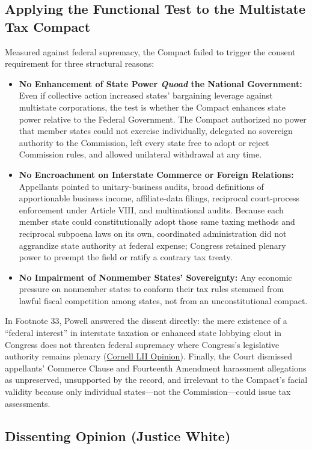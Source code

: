 \documentclass[12pt]{article}
\begin{document}
\subsection{Applying the Functional Test to the Multistate Tax Compact}
Measured against federal supremacy, the Compact failed to trigger the consent requirement for three structural reasons:
\begin{itemize}
  \item \textbf{No Enhancement of State Power \textit{Quoad} the National Government:} Even if collective action increased states' bargaining leverage against multistate corporations, the test is whether the Compact enhances state power relative to the Federal Government. The Compact authorized no power that member states could not exercise individually, delegated no sovereign authority to the Commission, left every state free to adopt or reject Commission rules, and allowed unilateral withdrawal at any time.
  \item \textbf{No Encroachment on Interstate Commerce or Foreign Relations:} Appellants pointed to unitary-business audits, broad definitions of apportionable business income, affiliate-data filings, reciprocal court-process enforcement under Article VIII, and multinational audits. Because each member state could constitutionally adopt those same taxing methods and reciprocal subpoena laws on its own, coordinated administration did not aggrandize state authority at federal expense; Congress retained plenary power to preempt the field or ratify a contrary tax treaty.
  \item \textbf{No Impairment of Nonmember States' Sovereignty:} Any economic pressure on nonmember states to conform their tax rules stemmed from lawful fiscal competition among states, not from an unconstitutional compact.
\end{itemize}
In Footnote 33, Powell answered the dissent directly: the mere existence of a ``federal interest'' in interstate taxation or enhanced state lobbying clout in Congress does not threaten federal supremacy where Congress's legislative authority remains plenary (\href{https://www.law.cornell.edu/supremecourt/text/434/452}{Cornell LII Opinion}). Finally, the Court dismissed appellants' Commerce Clause and Fourteenth Amendment harassment allegations as unpreserved, unsupported by the record, and irrelevant to the Compact's facial validity because only individual states---not the Commission---could issue tax assessments.

\subsection{Dissenting Opinion (Justice White)}
\end{document}
